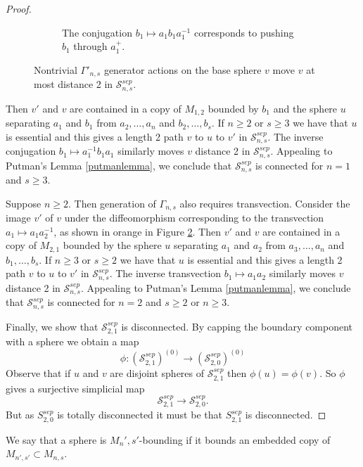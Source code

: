 \documentclass[11pt]{article}
\theoremstyle{remark}
\theoremstyle{definition}
\begin{document}
\begin{proof}
\begin{figure}[b!]
\begin{subfigure}[t]{0.3\textwidth}
        \caption{The conjugation $b_1 \mapsto a_1b_1a_1^{-1}$
        corresponds to pushing
        $b_1$ through $a_1^+$.}
        \label{fig:kput1}
    \end{subfigure}
    \caption{Nontrivial $\Gamma'_{n,s}$ generator actions on the base sphere $v$
    move $v$ at most distance 2 in $\mathcal S^{sep}_{n,s}$.}
    \label{sepconnect}
\end{figure}


Then $v'$ and $v$ are contained in a copy of $M_{1,2}$ bounded by $b_1$
and the sphere $u$ separating $a_1$ and $b_1$ from
$a_2, \ldots, a_n$ and $b_2, \ldots, b_s$.
If $n\geq 2$ or $s\geq 3$ we have that $u$
is essential and this gives a length 2 path $v$ to $u$ to $v'$ in $\mathcal {S}^{sep}_{n,s}$.
The inverse conjugation $b_1 \mapsto a_1^{-1}b_1a_1$ similarly
moves $v$ distance 2 in $\mathcal {S}^{sep}_{n,s}$.
Appealing to Putman's Lemma \ref{putmanlemma}, we conclude that
$\mathcal {S}^{sep}_{n,s}$ is connected for $n=1$ and $s\geq 3$.

Suppose $n \geq 2$.
Then generation of $\Gamma_{n,s}$ also requires transvection.
Consider the image $v'$ of $v$ under the
diffeomorphism corresponding to
the transvection $a_1 \mapsto a_1a_2^{-1}$,
as shown in orange in Figure \ref{sepconnect}.
Then $v'$ and $v$ are contained in a copy of $M_{2,1}$ bounded by
the sphere $u$ separating $a_1$ and $a_2$ from
$a_3, \ldots, a_n$ and $b_1, \ldots, b_s$.
If $n\geq 3$ or $s\geq 2$ we have that $u$
is essential and this gives a length 2 path $v$ to $u$ to $v'$ in $\mathcal {S}^{sep}_{n,s}$.
The inverse transvection $b_1 \mapsto a_1a_2$ similarly
moves $v$ distance 2 in $\mathcal {S}^{sep}_{n,s}$.
Appealing to Putman's Lemma \ref{putmanlemma}, we conclude that
$\mathcal {S}^{sep}_{n,s}$ is connected for $n=2$ and $s\geq 2$ or $n\geq 3$.




Finally, we show that $\mathcal {S}^{sep}_{2,1}$
is disconnected.
By capping the boundary component with a sphere we obtain a map
$$
\phi: \left (\mathcal {S}^{sep}_{2,1} \right )^{(0)} \to \left (\mathcal {S}^{sep}_{2,0} \right )^{(0)}
$$
Observe that if $u$ and $v$ are disjoint spheres of $\mathcal {S}^{sep}_{2,1}$
then $\phi(u)=\phi(v)$.
So $\phi$ gives a surjective simplicial map
$$
\mathcal {S}^{sep}_{2,1}  \to \mathcal {S}^{sep}_{2,0}.
$$
But as ${S}^{sep}_{2,0}$ is totally disconnected it must be that ${S}^{sep}_{2,1}$
is disconnected.
\end{proof}


\noindent
We say that a sphere is $M_n',s'$-bounding if it bounds an embedded copy of $M_{n',s'} \subset M_{n,s}$.
\end{document}

